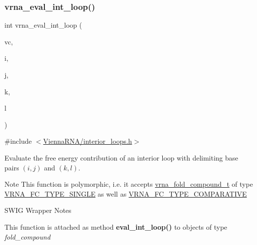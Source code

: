 \subsubsection{\texorpdfstring{vrna\+\_\+eval\+\_\+int\+\_\+loop()}{vrna\_eval\_int\_loop()}}
{\footnotesize\ttfamily int vrna\+\_\+eval\+\_\+int\+\_\+loop (\begin{DoxyParamCaption}\item[{\hyperlink{group__fold__compound_ga1b0cef17fd40466cef5968eaeeff6166}{vrna\+\_\+fold\+\_\+compound\+\_\+t} $\ast$}]{vc,  }\item[{int}]{i,  }\item[{int}]{j,  }\item[{int}]{k,  }\item[{int}]{l }\end{DoxyParamCaption})}



{\ttfamily \#include $<$\hyperlink{interior__loops_8h}{Vienna\+R\+N\+A/interior\+\_\+loops.\+h}$>$}



Evaluate the free energy contribution of an interior loop with delimiting base pairs $(i,j)$ and $(k,l)$. 

\begin{DoxyNote}{Note}
This function is polymorphic, i.\+e. it accepts \hyperlink{group__fold__compound_ga1b0cef17fd40466cef5968eaeeff6166}{vrna\+\_\+fold\+\_\+compound\+\_\+t} of type \hyperlink{group__fold__compound_gga01a4ff86fa71deaaa5d1abbd95a1447da7e264dd3cf2dc9b6448caabcb7763cd6}{V\+R\+N\+A\+\_\+\+F\+C\+\_\+\+T\+Y\+P\+E\+\_\+\+S\+I\+N\+G\+LE} as well as \hyperlink{group__fold__compound_gga01a4ff86fa71deaaa5d1abbd95a1447dab821ce46ea3cf665be97df22a76f5023}{V\+R\+N\+A\+\_\+\+F\+C\+\_\+\+T\+Y\+P\+E\+\_\+\+C\+O\+M\+P\+A\+R\+A\+T\+I\+VE}
\end{DoxyNote}
\begin{DoxyRefDesc}{S\+W\+I\+G Wrapper Notes}
\item[\hyperlink{wrappers__wrappers000034}{S\+W\+I\+G Wrapper Notes}]This function is attached as method {\bfseries eval\+\_\+int\+\_\+loop()} to objects of type {\itshape fold\+\_\+compound} \end{DoxyRefDesc}
\mbox{\label{group__loops_ga73f048d35475e1d8f50b7d4ac6a2aeb6}} 
